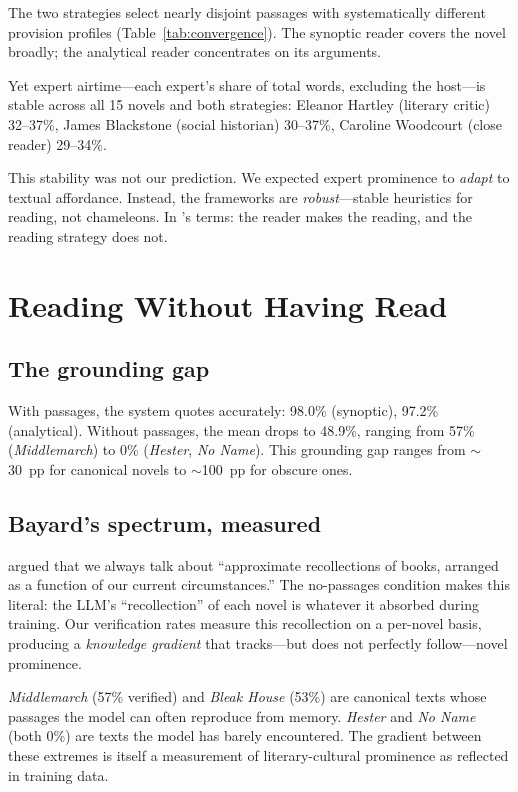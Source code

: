\documentclass{article}
\begin{document}
The two strategies select nearly disjoint passages with systematically
different provision profiles (Table~\ref{tab:convergence}).  The
synoptic reader covers the novel broadly; the analytical reader
concentrates on its arguments.

Yet expert airtime---each expert's share of total words, excluding the
host---is stable across all 15 novels and both strategies: Eleanor
Hartley (literary critic) 32--37\%, James Blackstone (social historian)
30--37\%, Caroline Woodcourt (close reader) 29--34\%.

This stability was not our prediction.  We expected expert prominence
to \emph{adapt} to textual affordance.  Instead, the frameworks are
\emph{robust}---stable heuristics for reading, not chameleons.  In
\textcite{fish1980text}'s terms: the reader makes the reading, and the
reading strategy does not.


\section{Reading Without Having Read}
\label{sec:grounding}

\subsection{The grounding gap}

With passages, the system quotes accurately: 98.0\% (synoptic), 97.2\%
(analytical).  Without passages, the mean drops to 48.9\%, ranging from
57\% (\emph{Middlemarch}) to 0\% (\emph{Hester}, \emph{No Name}).
This grounding gap ranges from $\sim$30~pp for canonical novels to
$\sim$100~pp for obscure ones.

\subsection{Bayard's spectrum, measured}

\textcite{bayard2007comment} argued that we always talk about
``approximate recollections of books, arranged as a function of our
current circumstances.''  The no-passages condition makes this literal:
the LLM's ``recollection'' of each novel is whatever it absorbed during
training.  Our verification rates measure this recollection on a
per-novel basis, producing a \emph{knowledge gradient} that tracks---but
does not perfectly follow---novel prominence.

\emph{Middlemarch} (57\% verified) and \emph{Bleak House} (53\%) are
canonical texts whose passages the model can often reproduce from
memory.  \emph{Hester} \parencite{oliphant1883hester} and \emph{No
Name} (both 0\%) are texts the model has barely encountered.  The
gradient between these extremes is itself a measurement of
literary-cultural prominence as reflected in training data.
\end{document}
